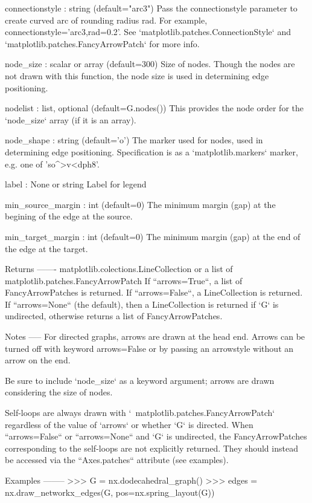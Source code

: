 \begin{DoxyVerb}
connectionstyle : string (default="arc3")
    Pass the connectionstyle parameter to create curved arc of rounding
    radius rad. For example, connectionstyle='arc3,rad=0.2'.
    See `matplotlib.patches.ConnectionStyle` and
    `matplotlib.patches.FancyArrowPatch` for more info.

node_size : scalar or array (default=300)
    Size of nodes. Though the nodes are not drawn with this function, the
    node size is used in determining edge positioning.

nodelist : list, optional (default=G.nodes())
   This provides the node order for the `node_size` array (if it is an array).

node_shape :  string (default='o')
    The marker used for nodes, used in determining edge positioning.
    Specification is as a `matplotlib.markers` marker, e.g. one of 'so^>v<dph8'.

label : None or string
    Label for legend

min_source_margin : int (default=0)
    The minimum margin (gap) at the begining of the edge at the source.

min_target_margin : int (default=0)
    The minimum margin (gap) at the end of the edge at the target.

Returns
-------
 matplotlib.colections.LineCollection or a list of matplotlib.patches.FancyArrowPatch
    If ``arrows=True``, a list of FancyArrowPatches is returned.
    If ``arrows=False``, a LineCollection is returned.
    If ``arrows=None`` (the default), then a LineCollection is returned if
    `G` is undirected, otherwise returns a list of FancyArrowPatches.

Notes
-----
For directed graphs, arrows are drawn at the head end.  Arrows can be
turned off with keyword arrows=False or by passing an arrowstyle without
an arrow on the end.

Be sure to include `node_size` as a keyword argument; arrows are
drawn considering the size of nodes.

Self-loops are always drawn with `~matplotlib.patches.FancyArrowPatch`
regardless of the value of `arrows` or whether `G` is directed.
When ``arrows=False`` or ``arrows=None`` and `G` is undirected, the
FancyArrowPatches corresponding to the self-loops are not explicitly
returned. They should instead be accessed via the ``Axes.patches``
attribute (see examples).

Examples
--------
>>> G = nx.dodecahedral_graph()
>>> edges = nx.draw_networkx_edges(G, pos=nx.spring_layout(G))


\end{DoxyVerb}
